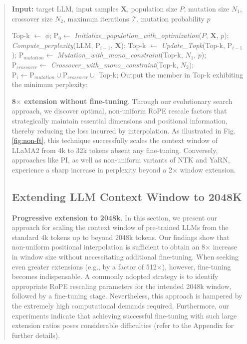 \begin{abstract}
\begin{algorithm}[t]
	\small
	\caption{The search algorithm}
	\textbf{Input:} target LLM, input samples $\mathbf{X}$, population size $P$, mutation size $N_1$, crossover size $N_2$, maximum iterations $\mathcal{T}$, mutation probability $p$\\

	\begin{algorithmic}[1]
		\label{alg:search}
		\STATE Top-k $\gets$ $\phi$;	
		\STATE $\text{P}_0 \gets$ \textit{Initialize\_population\_with\_optimization}($P$, $\mathbf{X}$, $p$);
		\STATE \textit{Compute\_perplexity}(LLM, $\text{P}_{i-1}$, $\mathbf{X}$);
		\STATE Top-k $\gets$ \textit{Update\_Topk}(Top-k, $\text{P}_{i-1}$);
		\STATE $\text{P}_{mutation} \gets$ \textit{Mutation\_with\_mono\_constraint}(Top-k, $N_1$, $p$);
		\STATE $\text{P}_{crossover} \gets$ \textit{Crossover\_with\_mono\_constraint}(Top-k, $N_2$);
		\STATE $\text{P}_i \gets \text{P}_{mutation} \cup \text{P}_{crossover} \cup$ Top-k;
		\ENDFOR
		\STATE Output the member in Top-k exhibiting the minimum perplexity;
	\end{algorithmic}
\end{algorithm}

\textbf{8$\times$ extension without fine-tuning}. Through our evolutionary search approach, we discover optimal, non-uniform RoPE rescale factors that strategically maintain essential dimensions and positional information, thereby reducing the loss incurred by interpolation. As illustrated in Fig.\ref{fig:non-ft}, this technique successfully scales the context window of LLaMA2 from 4k to 32k tokens absent any fine-tuning. Conversely, approaches like PI, as well as non-uniform variants of NTK and YaRN, experience a sharp increase in perplexity beyond a 2$\times$ window extension.

\subsection{Extending LLM Context Window to 2048K}
\label{sec:extendto2048k}

\textbf{Progressive extension to 2048k}. In this section, we present our approach for scaling the context window of pre-trained LLMs from the standard 4k tokens up to beyond 2048k tokens. Our findings show that non-uniform positional interpolation is sufficient to obtain an 8$\times$ increase in window size without necessitating additional fine-tuning. When seeking even greater extensions (e.g., by a factor of 512$\times$), however, fine-tuning becomes indispensable. A commonly adopted strategy is to identify appropriate RoPE rescaling parameters for the intended 2048k window, followed by a fine-tuning stage. Nevertheless, this approach is hampered by the extremely high computational demands required. Furthermore, our experiments indicate that achieving successful fine-tuning with such large extension ratios poses considerable difficulties (refer to the Appendix for further details).


\end{abstract}
